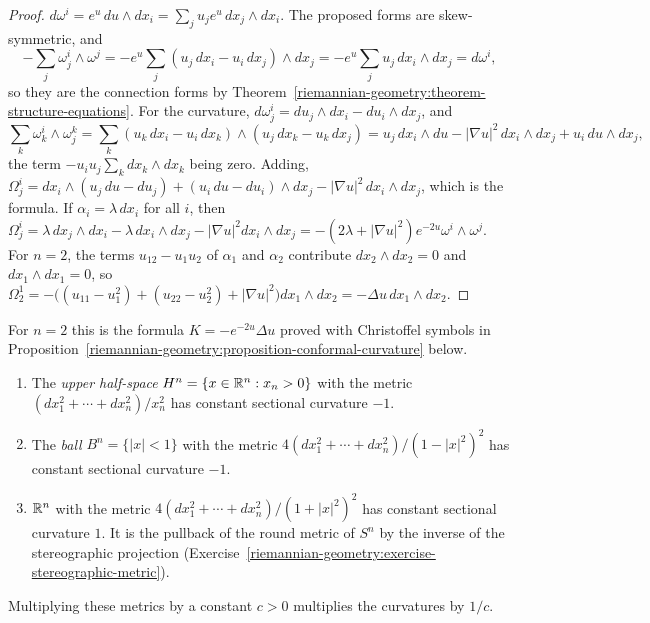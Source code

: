 \begin{proof}
$d\omega^i = e^u\,du \wedge dx_i = \sum_ju_je^u\,dx_j \wedge dx_i$. The proposed forms are skew-symmetric, and
\[
-\sum_j\omega^i_j \wedge \omega^j = -e^u\sum_j(u_j\,dx_i - u_i\,dx_j) \wedge dx_j = -e^u\sum_ju_j\,dx_i \wedge dx_j = d\omega^i,
\]
so they are the connection forms by Theorem~\ref{riemannian-geometry:theorem-structure-equations}. For the curvature, $d\omega^i_j = du_j \wedge dx_i - du_i \wedge dx_j$, and
\[
\sum_k\omega^i_k \wedge \omega^k_j = \sum_k(u_k\,dx_i - u_i\,dx_k) \wedge (u_j\,dx_k - u_k\,dx_j) = u_j\,dx_i \wedge du - |\nabla u|^2\,dx_i \wedge dx_j + u_i\,du \wedge dx_j,
\]
the term $-u_iu_j\sum_kdx_k \wedge dx_k$ being zero. Adding,
$\Omega^i_j = dx_i \wedge (u_j\,du - du_j) + (u_i\,du - du_i) \wedge dx_j - |\nabla u|^2\,dx_i \wedge dx_j$, which is the formula. If $\alpha_i = \lambda\,dx_i$ for all $i$, then
$\Omega^i_j = \lambda\,dx_j \wedge dx_i - \lambda\,dx_i \wedge dx_j - |\nabla u|^2dx_i \wedge dx_j = -(2\lambda + |\nabla u|^2)e^{-2u}\omega^i \wedge \omega^j$. For $n = 2$, the terms $u_{12} - u_1u_2$
of $\alpha_1$ and $\alpha_2$ contribute $dx_2 \wedge dx_2 = 0$ and $dx_1 \wedge dx_1 = 0$, so
$\Omega^1_2 = -\bigl((u_{11} - u_1^2) + (u_{22} - u_2^2) + |\nabla u|^2\bigr)dx_1 \wedge dx_2 = -\Delta u\,dx_1 \wedge dx_2$.
\end{proof}

For $n = 2$ this is the formula $K = -e^{-2u}\Delta u$ proved with Christoffel symbols in Proposition~\ref{riemannian-geometry:proposition-conformal-curvature} below.

\begin{corollary}\label{riemannian-geometry:corollary-hyperbolic-curvature}
\begin{enumerate}
\item The \emph{upper half-space} $H^n = \{x \in \mathbb{R}^n : x_n > 0\}$ with the metric $(dx_1^2 + \cdots + dx_n^2)/x_n^2$ has constant sectional curvature $-1$.
\item The \emph{ball} $B^n = \{|x| < 1\}$ with the metric $4(dx_1^2 + \cdots + dx_n^2)/(1 - |x|^2)^2$ has constant sectional curvature $-1$.
\item $\mathbb{R}^n$ with the metric $4(dx_1^2 + \cdots + dx_n^2)/(1 + |x|^2)^2$ has constant sectional curvature $1$. It is the pullback of the round metric of $S^n$ by the inverse of the stereographic
projection (Exercise~\ref{riemannian-geometry:exercise-stereographic-metric}).
\end{enumerate}
Multiplying these metrics by a constant $c > 0$ multiplies the curvatures by $1/c$.
\end{corollary}

